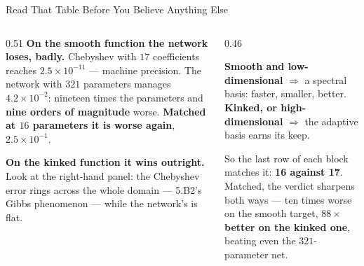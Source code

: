 \begin{frame}{Read That Table Before You Believe Anything Else}
\begin{columns}[T]
\begin{column}{0.51\textwidth}
\small
\textbf{On the smooth function the network loses, badly.} Chebyshev with $17$ coefficients reaches $2.5\times10^{-11}$ --- machine precision. The network with $321$ parameters manages $4.2\times10^{-2}$: nineteen times the parameters and \textbf{nine orders of magnitude} worse. \textbf{Matched at $16$ parameters it is worse again}, $2.5\times10^{-1}$.
\medskip

\textbf{On the kinked function it wins outright.} Look at the right-hand panel: the Chebyshev error rings across the whole domain --- 5.B2's Gibbs phenomenon --- while the network's is flat.
\end{column}
\begin{column}{0.46\textwidth}
\begin{takeawaybox}[title=\textbf{The rule this gives you}]\footnotesize
\textbf{Smooth and low-dimensional} $\Rightarrow$ a spectral basis: faster, smaller, better. \textbf{Kinked, or high-dimensional} $\Rightarrow$ the adaptive basis earns its keep.
\end{takeawaybox}
\smallskip
\begin{cautionbox}[title=\textbf{``But the network had more parameters''}]\footnotesize
So the last row of each block matches it: \textbf{16 against 17}. Matched, the verdict sharpens both ways --- ten times worse on the smooth target, \textbf{$88\times$ better on the kinked one}, beating even the $321$-parameter net.
\end{cautionbox}
\end{column}
\end{columns}
\vspace{1mm}
\end{frame}

